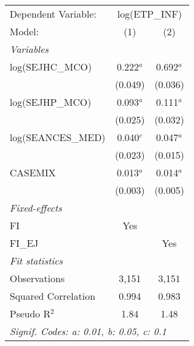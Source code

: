 
\begingroup
\centering
\begin{tabular}{lcc}
   \tabularnewline \midrule \midrule
   Dependent Variable: & \multicolumn{2}{c}{log(ETP\_INF)}\\
   Model:              & (1)         & (2)\\  
   \midrule
   \emph{Variables}\\
   log(SEJHC\_MCO)     & 0.222$^{a}$ & 0.692$^{a}$\\   
                       & (0.049)     & (0.036)\\   
   log(SEJHP\_MCO)     & 0.093$^{a}$ & 0.111$^{a}$\\   
                       & (0.025)     & (0.032)\\   
   log(SEANCES\_MED)   & 0.040$^{c}$ & 0.047$^{a}$\\   
                       & (0.023)     & (0.015)\\   
   CASEMIX             & 0.013$^{a}$ & 0.014$^{a}$\\   
                       & (0.003)     & (0.005)\\   
   \midrule
   \emph{Fixed-effects}\\
   FI                  & Yes         & \\  
   FI\_EJ              &             & Yes\\  
   \midrule
   \emph{Fit statistics}\\
   Observations        & 3,151       & 3,151\\  
   Squared Correlation & 0.994       & 0.983\\  
   Pseudo R$^2$        & 1.84        & 1.48\\  
   \midrule \midrule
   \multicolumn{3}{l}{\emph{Signif. Codes: a: 0.01, b: 0.05, c: 0.1}}\\
\end{tabular}
\par\endgroup


